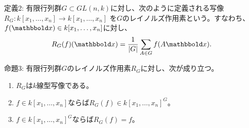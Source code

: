 \begin{framed}
  定義2:
  有限行列群$G\subset GL(n,k)$に対し、次のように定義される写像
  $R_G\colon k[x_1,\dots,x_n]\to k[x_1,\dots,x_n]$
  を$G$のレイノルズ作用素という。すなわち、$f(\bbold x) \in k[x_1,\dots,x_n]$に対し、
  \begin{align}
    R_G(f)(\bbold x) = \frac{1}{\myabs{G}}\sum_{A\in G} f(A \bbold x).
  \end{align}

\end{framed}

\begin{framed}
  命題3:
  有限行列群$G$のレイノルズ作用素$R_G$に対し、次が成り立つ。
  \begin{enumerate}[label=(\roman*)]
    \item $R_G$は$k$線型写像である。
    \item $f\in k[x_1,\dots,x_n]$ならば$R_G(f)\in k[x_1,\dots,x_n]^G$。
    \item $f\in k[x_1,\dots,x_n]^G$ならば$R_G(f) = f$。
  \end{enumerate}
\end{framed}

